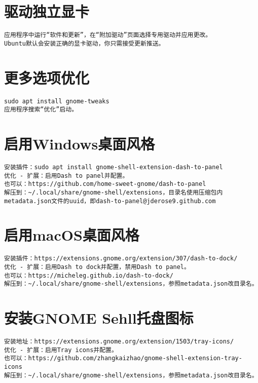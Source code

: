 \documentclass[a4paper,fontset=fandol,zihao=-4,linespread=1.2]{ctexbook}
\begin{document}
\section{驱动独立显卡}
\begin{lstlisting}
应用程序中运行“软件和更新”，在“附加驱动”页面选择专用驱动并应用更改。
Ubuntu默认会安装正确的显卡驱动，你只需接受更新推送。
\end{lstlisting}

\section{更多选项优化}
\begin{lstlisting}
sudo apt install gnome-tweaks
应用程序搜索“优化”启动。
\end{lstlisting}

\section{启用Windows桌面风格}
\begin{lstlisting}
安装插件：sudo apt install gnome-shell-extension-dash-to-panel
优化 - 扩展：启用Dash to panel并配置。
也可以：https://github.com/home-sweet-gnome/dash-to-panel
解压到：~/.local/share/gnome-shell/extensions，目录名使用压缩包内metadata.json文件的uuid，即dash-to-panel@jderose9.github.com
\end{lstlisting}

\section{启用macOS桌面风格}
\begin{lstlisting}
安装插件：https://extensions.gnome.org/extension/307/dash-to-dock/
优化 - 扩展：启用Dash to dock并配置，禁用Dash to panel。
也可以：https://micheleg.github.io/dash-to-dock/
解压到：~/.local/share/gnome-shell/extensions，参照metadata.json改目录名。
\end{lstlisting}

\section{安装GNOME Sehll托盘图标}
\begin{lstlisting}
安装地址：https://extensions.gnome.org/extension/1503/tray-icons/
优化 - 扩展：启用Tray icons并配置。
也可以：https://github.com/zhangkaizhao/gnome-shell-extension-tray-icons
解压到：~/.local/share/gnome-shell/extensions，参照metadata.json改目录名。
\end{lstlisting}
\end{document}
